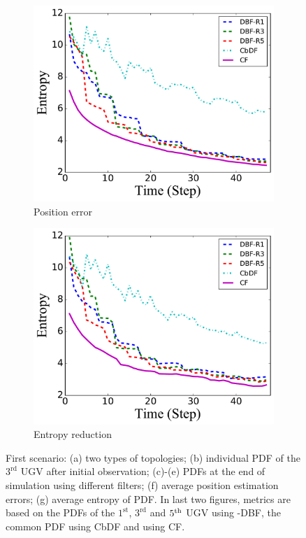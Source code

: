 \begin{figure}
\begin{subfigure}[b]{0.23\textwidth}
			\includegraphics[width=\textwidth]{figures/hetero_mov_sen_mov_tar_entropy_noise_circle}
			\caption{Position error}\label{fig:cir_ent}
		\end{subfigure}	
		\begin{subfigure}[b]{0.23\textwidth}
			\includegraphics[width=\textwidth]{figures/hetero_mov_sen_mov_tar_entropy_noise_sin}
			\caption{Entropy reduction}\label{fig:sin_ent}
		\end{subfigure}		
		\caption{First scenario: (a) two types of topologies; (b) individual PDF of the $3^\text{rd}$ UGV after initial observation; (c)-(e) PDFs at the end of simulation using different filters; (f) average position estimation errors; (g) average entropy of PDF. In last two figures, metrics are based on the PDFs of the $1^\text{st}$, $3^\text{rd}$ and $5^\text{th}$ UGV using \proto-DBF, the common PDF using CbDF and using CF.}
		\label{fig:metrics}
	\end{figure}
	
